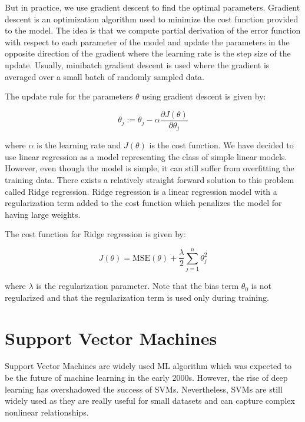 But in practice, we use gradient descent to find the optimal parameters.
Gradient descent is an optimization algorithm used to minimize the cost
function provided to the model. The idea is that we compute
partial derivation of the error function with respect to each parameter
of the model and update the parameters in the opposite direction of the gradient
where the learning rate is the step size of the update. Usually, 
minibatch gradient descent is used where the gradient is averaged over a small
batch of randomly sampled data.

The update rule for the parameters \(\theta\) using gradient descent is given by:

\begin{equation}
    \theta_j := \theta_j - \alpha \frac{\partial J(\theta)}{\partial \theta_j}
\end{equation}

where \(\alpha\) is the learning rate and \(J(\theta)\) is the cost function.
We have decided to use linear regression as a model representing 
the class of simple linear models. However, even though the model is simple,
it can still suffer from overfitting the training data. There exists
a relatively straight forward solution to this problem called Ridge regression.
Ridge regression is a linear regression model with a regularization term added to the cost function
which penalizes the model for having large weights. 

The cost function for Ridge regression is given by:

\begin{equation}
    J(\theta) = \text{MSE}(\theta) + \frac{\lambda}{2} \sum_{j=1}^{n} \theta_j^2
\end{equation}

where \( \lambda \) is the regularization parameter. Note that the bias term \(\theta_0\) is not regularized
and that the regularization term is used only during training.


\section{Support Vector Machines}

Support Vector Machines are widely used \ac{ML} algorithm which was expected to 
be the future of machine learning in the early 2000s. However, the rise of deep learning
has overshadowed the success of \ac{SVM}s. Nevertheless, \ac{SVM}s are still widely used
as they are really useful for small datasets and can capture complex nonlinear relationships.

